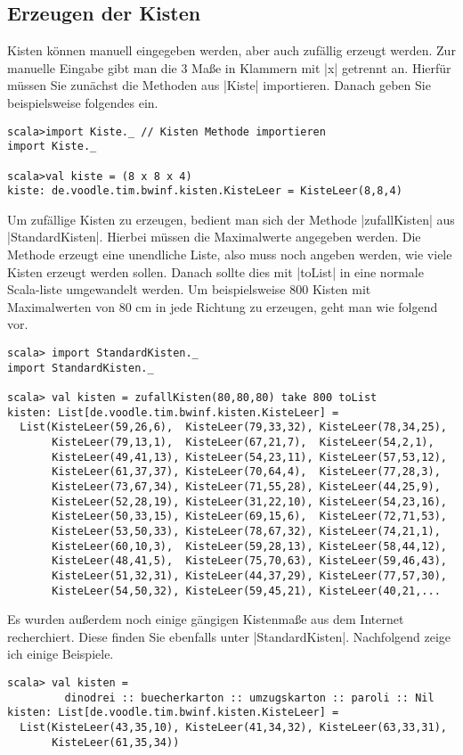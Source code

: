 \subsection{Erzeugen der Kisten}
Kisten können manuell eingegeben werden, aber auch zufällig erzeugt werden.
Zur manuelle Eingabe gibt man die 3 Maße in Klammern mit |x| getrennt an.
Hierfür müssen Sie zunächst die Methoden aus |Kiste| importieren. Danach geben Sie beispielsweise folgendes ein.
\begin{lstlisting}
scala>import Kiste._ // Kisten Methode importieren
import Kiste._

scala>val kiste = (8 x 8 x 4)
kiste: de.voodle.tim.bwinf.kisten.KisteLeer = KisteLeer(8,8,4)

\end{lstlisting}
Um zufällige Kisten zu erzeugen, bedient man sich der Methode |zufallKisten| aus |StandardKisten|.
Hierbei müssen die Maximalwerte angegeben werden.
Die Methode erzeugt eine unendliche Liste, also muss noch angeben werden, wie viele Kisten erzeugt werden sollen.
Danach sollte dies mit |toList| in eine normale Scala-liste umgewandelt werden.
Um beispielsweise 800 Kisten mit Maximalwerten von 80 cm in jede Richtung zu erzeugen, geht man wie folgend vor.
\begin{lstlisting}
scala> import StandardKisten._
import StandardKisten._

scala> val kisten = zufallKisten(80,80,80) take 800 toList
kisten: List[de.voodle.tim.bwinf.kisten.KisteLeer] =
  List(KisteLeer(59,26,6),  KisteLeer(79,33,32), KisteLeer(78,34,25),
       KisteLeer(79,13,1),  KisteLeer(67,21,7),  KisteLeer(54,2,1),
       KisteLeer(49,41,13), KisteLeer(54,23,11), KisteLeer(57,53,12),
       KisteLeer(61,37,37), KisteLeer(70,64,4),  KisteLeer(77,28,3),
       KisteLeer(73,67,34), KisteLeer(71,55,28), KisteLeer(44,25,9),
       KisteLeer(52,28,19), KisteLeer(31,22,10), KisteLeer(54,23,16),
       KisteLeer(50,33,15), KisteLeer(69,15,6),  KisteLeer(72,71,53),
       KisteLeer(53,50,33), KisteLeer(78,67,32), KisteLeer(74,21,1),
       KisteLeer(60,10,3),  KisteLeer(59,28,13), KisteLeer(58,44,12),
       KisteLeer(48,41,5),  KisteLeer(75,70,63), KisteLeer(59,46,43),
       KisteLeer(51,32,31), KisteLeer(44,37,29), KisteLeer(77,57,30),
       KisteLeer(54,50,32), KisteLeer(59,45,21), KisteLeer(40,21,...
\end{lstlisting}
Es wurden außerdem noch einige gängigen Kistenmaße aus dem Internet recherchiert.
Diese finden Sie ebenfalls unter |StandardKisten|.
Nachfolgend zeige ich einige Beispiele.
\begin{lstlisting}
scala> val kisten =
         dinodrei :: buecherkarton :: umzugskarton :: paroli :: Nil
kisten: List[de.voodle.tim.bwinf.kisten.KisteLeer] =
  List(KisteLeer(43,35,10), KisteLeer(41,34,32), KisteLeer(63,33,31),
       KisteLeer(61,35,34))

\end{lstlisting}
